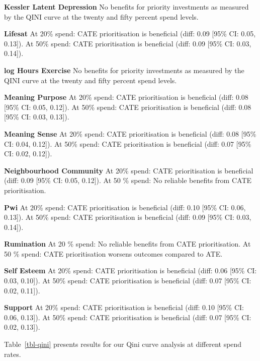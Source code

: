 \documentclass[
  single column]{article}
\begin{document}
\textbf{Kessler Latent Depression} No benefits for priority investments
as measured by the QINI curve at the twenty and fifty percent spend
levels.

\textbf{Lifesat} At 20\% spend: CATE prioritisation is beneficial (diff:
0.09 {[}95\% CI: 0.05, 0.13{]}). At 50\% spend: CATE prioritisation is
beneficial (diff: 0.09 {[}95\% CI: 0.03, 0.14{]}).

\textbf{log Hours Exercise} No benefits for priority investments as
measured by the QINI curve at the twenty and fifty percent spend levels.

\textbf{Meaning Purpose} At 20\% spend: CATE prioritisation is
beneficial (diff: 0.08 {[}95\% CI: 0.05, 0.12{]}). At 50\% spend: CATE
prioritisation is beneficial (diff: 0.08 {[}95\% CI: 0.03, 0.13{]}).

\textbf{Meaning Sense} At 20\% spend: CATE prioritisation is beneficial
(diff: 0.08 {[}95\% CI: 0.04, 0.12{]}). At 50\% spend: CATE
prioritisation is beneficial (diff: 0.07 {[}95\% CI: 0.02, 0.12{]}).

\textbf{Neighbourhood Community} At 20\% spend: CATE prioritisation is
beneficial (diff: 0.09 {[}95\% CI: 0.05, 0.12{]}). At 50 \% spend: No
reliable benefits from CATE prioritisation.

\textbf{Pwi} At 20\% spend: CATE prioritisation is beneficial (diff:
0.10 {[}95\% CI: 0.06, 0.13{]}). At 50\% spend: CATE prioritisation is
beneficial (diff: 0.09 {[}95\% CI: 0.03, 0.14{]}).

\textbf{Rumination} At 20 \% spend: No reliable benefits from CATE
prioritisation. At 50 \% spend: CATE prioritisation worsens outcomes
compared to ATE.

\textbf{Self Esteem} At 20\% spend: CATE prioritisation is beneficial
(diff: 0.06 {[}95\% CI: 0.03, 0.10{]}). At 50\% spend: CATE
prioritisation is beneficial (diff: 0.07 {[}95\% CI: 0.02, 0.11{]}).

\textbf{Support} At 20\% spend: CATE prioritisation is beneficial (diff:
0.10 {[}95\% CI: 0.06, 0.13{]}). At 50\% spend: CATE prioritisation is
beneficial (diff: 0.07 {[}95\% CI: 0.02, 0.13{]}).

Table~\ref{tbl-qini} presents results for our Qini curve analysis at
different spend rates.
\end{document}
